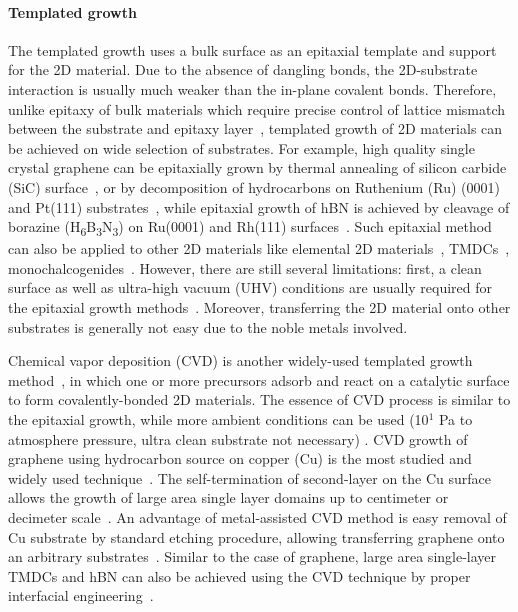 \paragraph{Templated growth}
The templated growth uses a bulk surface as an epitaxial template and
support for the 2D material. Due to the absence of dangling bonds, the
2D-substrate interaction is usually much weaker than the in-plane
covalent bonds. Therefore, unlike epitaxy of bulk materials which
require precise control of lattice mismatch between the substrate and
epitaxy
layer~\autocite{Koma_1985_vdWE,Ueno_1990_vdWE,Parkinson_1991_vdWE},
templated growth of 2D materials can be achieved on wide selection of
substrates. For example, high quality single crystal graphene can be
epitaxially grown by thermal annealing of silicon carbide (SiC)
surface~\autocite{Berger_2004_sic,de_Heer_2007_epi_gr}, or by decomposition of
hydrocarbons on Ruthenium (Ru) (0001) and Pt(111)
substrates~\autocite{Sutter_2008_gr_Ru,Sutter_2009_Gr_Pt}, while epitaxial
growth of hBN is achieved by cleavage of borazine
(H\textsubscript{6}B\textsubscript{3}N\textsubscript{3}) on Ru(0001)
and Rh(111)
surfaces~\autocite{Goriachko_2007_assembl_hBN_ru,Goriachko_2008_AuNP_moire_hBN}.
%
Such epitaxial method can also be applied to other 2D materials like
elemental 2D
materials~\autocite{Aufray_2010_silicene,Liu_2017_assemb_borophene},
TMDCs~\autocite{Ugeda_2015_deposition},
monochalcogenides~\autocite{Yang_2017_InSe}.
%
However, there are still several limitations: first, a clean
surface as well as ultra-high vacuum (UHV) conditions are usually
required for the epitaxial growth
methods~\autocite{Liu_2018_rev}.
%
Moreover, transferring the 2D material
onto other substrates is generally not easy due to the noble metals
involved.
%

Chemical vapor deposition (CVD) is another widely-used templated
growth
method~\autocite{Li_2016_cvd_rev,Novoselov_2016_vdW,Lin_2019_gr_rev_growth},
in which one or more precursors adsorb and react on a catalytic
surface to form covalently-bonded 2D materials.
%
The essence of CVD process is similar to the epitaxial growth, while
more ambient conditions can be used (10$^{1}$ Pa to atmosphere pressure,
ultra clean substrate not necessary) \autocite{Li_2016_cvd_rev}.
%
CVD growth of graphene using hydrocarbon source on copper (Cu) is the
most studied and widely used technique~\autocite{Li_2016_cvd_rev}.
%
The self-termination of second-layer on the Cu surface allows the
growth of large area single layer domains up to centimeter or
decimeter
scale~\autocite{Li_2011_single_crystal,Bae_2010_gr_roll,Xu_2017_gr_single_large}.
An advantage of metal-assisted CVD method is easy removal of Cu
substrate by standard etching procedure, allowing transferring
graphene onto an arbitrary substrates~\autocite{Kim_2009_gr_transparent}.
%
Similar to the case of graphene, large area single-layer TMDCs and hBN
can also be achieved using the CVD technique by proper interfacial
engineering~\autocite{Shi_2012_vdw_epi_MoS2_gr,Lee_2018_gold_BN}.
%

